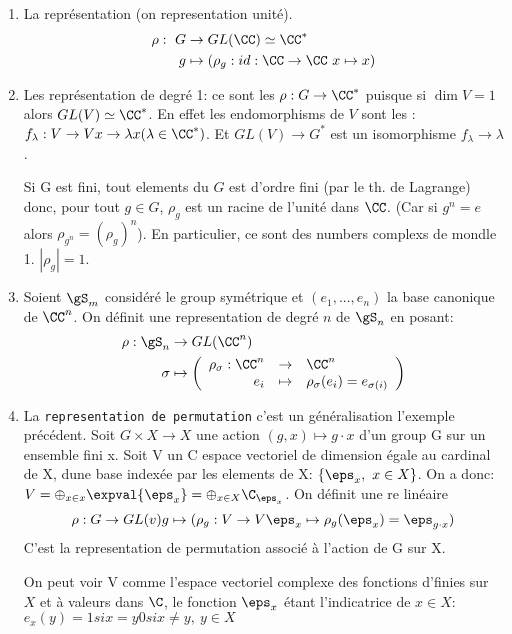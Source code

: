 \begin{examplebox}
	\begin{enumerate}
		\item La représentation  (on representation unité).
		\begin{align*}
			\rho:\ G &\rightarrow GL(\CC)\simeq\CC^\ast\\
			g &\mapsto (\rho_g: id:\CC\rightarrow \CC\ x\mapsto x)
		\end{align*}
		\item Les représentation de degré 1: ce sont les  $\rho:G\rightarrow \CC^\ast$ puisque si $\dim V= 1$ alors $GL(V)\simeq\CC^\ast$.
		En effet les endomorphisms de $V$ sont les : $f_\lambda: V\rightarrow V x\rightarrow \lambda x(\lambda\in \CC^\ast)$. Et $GL(V)\rightarrow  G^\ast$ est un isomorphisme $f_\lambda\rightarrow \lambda$.
		
		Si G est fini, tout elements du $G$ est d'ordre fini (par le th. de Lagrange) donc, pour tout $g \in G$, $\rho_g$ est un racine de l'unité dans $\CC$.
		(Car si $g^n=e$ alors $\rho_{g^n}=(\rho_g)^n$). En particulier, ce sont des numbers complexs de mondle 1. $|\rho_g|=1$.
		\item Soient $\gS_m$ considéré le group symétrique et $(e_1,..., e_n)$ la base canonique de $\CC^n$. On définit une representation de degré $n$ de $\gS_n$ en posant:
		\begin{align*}
			\rho:\gS_n &\rightarrow GL(\CC^n) \\
			\sigma &\mapsto \left(
				\begin{array}{rcl} \rho_\sigma: \CC^n &\rightarrow&  \CC^n \\ e_i &\mapsto& \rho_\sigma(e_i)=e_{\sigma(i)} \end{array}
			\right)
		\end{align*}
		\item La \texttt{representation de permutation} c'est un généralisation l'exemple précédent. Soit $G\times X\rightarrow X$ une action $(g,x)\mapsto g\cdot x$ d'un group G sur un ensemble fini x. Soit V un C espace vectoriel de dimension égale au cardinal de X, dune base indexée par les elements de X: $\{\eps_x,\ x\in X\}$. On a donc: $V=\oplus_{x\in x}\expval{\eps_x}=\oplus_{x\in X}\C_{\eps_x}$. On définit une re linéaire
		$$ \rho: G\rightarrow  GL(v)\\g\mapsto(\rho_g:V\rightarrow  V\\\eps_x\mapsto \rho_g(\eps_x)=\eps_{g\cdot x})$$
		C'est la representation de permutation associé à l'action de G sur X.
		\begin{remark}
			On peut voir V comme l'espace vectoriel complexe des fonctions d'finies sur $X$ et à valeurs dans $\C$, le fonction $\eps_x$ étant l'indicatrice de $x\in X$: $e_x(y)=1 si x=y 0 si x\neq y,\ y\in X$
		\end{remark}
		

\end{enumerate}
\end{examplebox}
